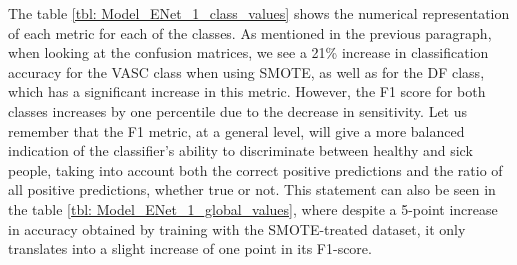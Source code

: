 \begin{table}[ht]
\centering
{}
    \caption{EffcientNet B0 Step 1. Metrics obtained by class.}
    \label{tbl: Model_ENet_1_class_values}
\end{table}

The table \ref{tbl: Model_ENet_1_class_values} shows the numerical representation of each metric for each of the classes. As mentioned in the previous paragraph, when looking at the confusion matrices, we see a 21\% increase in classification accuracy for the VASC class when using SMOTE, as well as for the DF class, which has a significant increase in this metric. However, the F1 score for both classes increases by one percentile due to the decrease in sensitivity.  Let us remember that the F1 metric, at a general level, will give a more balanced indication of the classifier's ability to discriminate between healthy and sick people, taking into account both the correct positive predictions and the ratio of all positive predictions, whether true or not. This statement can also be seen in the table \ref{tbl: Model_ENet_1_global_values}, where despite a 5-point increase in accuracy obtained by training with the SMOTE-treated dataset, it only translates into a slight increase of one point in its F1-score.

